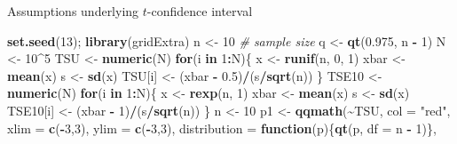 \documentclass[
  ignorenonframetext,
]{beamer}
\newenvironment{Shaded}{\begin{snugshade}}{\end{snugshade}}
\newcommand{\AttributeTok}[1]{\textcolor[rgb]{0.13,0.29,0.53}{#1}}
\newcommand{\CommentTok}[1]{\textcolor[rgb]{0.56,0.35,0.01}{\textit{#1}}}
\newcommand{\ControlFlowTok}[1]{\textcolor[rgb]{0.13,0.29,0.53}{\textbf{#1}}}
\newcommand{\DecValTok}[1]{\textcolor[rgb]{0.00,0.00,0.81}{#1}}
\newcommand{\FloatTok}[1]{\textcolor[rgb]{0.00,0.00,0.81}{#1}}
\newcommand{\FunctionTok}[1]{\textcolor[rgb]{0.13,0.29,0.53}{\textbf{#1}}}
\newcommand{\NormalTok}[1]{#1}
\newcommand{\OtherTok}[1]{\textcolor[rgb]{0.56,0.35,0.01}{#1}}
\newcommand{\SpecialCharTok}[1]{\textcolor[rgb]{0.81,0.36,0.00}{\textbf{#1}}}
\newcommand{\StringTok}[1]{\textcolor[rgb]{0.31,0.60,0.02}{#1}}
\begin{document}
\begin{frame}[fragile]{Assumptions underlying \(t\)-confidence interval}
\label{assumptions-underlying-t-confidence-interval-5}
\tiny

\begin{Shaded}
\begin{Highlighting}[]
\FunctionTok{set.seed}\NormalTok{(}\DecValTok{13}\NormalTok{); }\FunctionTok{library}\NormalTok{(gridExtra)}
\NormalTok{n }\OtherTok{\textless{}{-}} \DecValTok{10}           \CommentTok{\# sample size}
\NormalTok{q }\OtherTok{\textless{}{-}} \FunctionTok{qt}\NormalTok{(}\FloatTok{0.975}\NormalTok{, n }\SpecialCharTok{{-}} \DecValTok{1}\NormalTok{)}
\NormalTok{N }\OtherTok{\textless{}{-}} \DecValTok{10}\SpecialCharTok{\^{}}\DecValTok{5}
\NormalTok{TSU }\OtherTok{\textless{}{-}} \FunctionTok{numeric}\NormalTok{(N)}
\ControlFlowTok{for}\NormalTok{(i }\ControlFlowTok{in} \DecValTok{1}\SpecialCharTok{:}\NormalTok{N)\{}
\NormalTok{  x }\OtherTok{\textless{}{-}} \FunctionTok{runif}\NormalTok{(n, }\DecValTok{0}\NormalTok{, }\DecValTok{1}\NormalTok{)}
\NormalTok{  xbar }\OtherTok{\textless{}{-}} \FunctionTok{mean}\NormalTok{(x)}
\NormalTok{  s }\OtherTok{\textless{}{-}} \FunctionTok{sd}\NormalTok{(x)}
\NormalTok{  TSU[i] }\OtherTok{\textless{}{-}}\NormalTok{ (xbar }\SpecialCharTok{{-}} \FloatTok{0.5}\NormalTok{)}\SpecialCharTok{/}\NormalTok{(s}\SpecialCharTok{/}\FunctionTok{sqrt}\NormalTok{(n))}
\NormalTok{\}}
\NormalTok{TSE10 }\OtherTok{\textless{}{-}} \FunctionTok{numeric}\NormalTok{(N)}
\ControlFlowTok{for}\NormalTok{(i }\ControlFlowTok{in} \DecValTok{1}\SpecialCharTok{:}\NormalTok{N)\{}
\NormalTok{  x }\OtherTok{\textless{}{-}} \FunctionTok{rexp}\NormalTok{(n, }\DecValTok{1}\NormalTok{)}
\NormalTok{  xbar }\OtherTok{\textless{}{-}} \FunctionTok{mean}\NormalTok{(x)}
\NormalTok{  s }\OtherTok{\textless{}{-}} \FunctionTok{sd}\NormalTok{(x)}
\NormalTok{  TSE10[i] }\OtherTok{\textless{}{-}}\NormalTok{ (xbar }\SpecialCharTok{{-}} \DecValTok{1}\NormalTok{)}\SpecialCharTok{/}\NormalTok{(s}\SpecialCharTok{/}\FunctionTok{sqrt}\NormalTok{(n))}
\NormalTok{\}}
\NormalTok{n }\OtherTok{\textless{}{-}} \DecValTok{10}
\NormalTok{p1 }\OtherTok{\textless{}{-}} \FunctionTok{qqmath}\NormalTok{(}\SpecialCharTok{\textasciitilde{}}\NormalTok{TSU, }\AttributeTok{col =} \StringTok{"red"}\NormalTok{, }\AttributeTok{xlim =} \FunctionTok{c}\NormalTok{(}\SpecialCharTok{{-}}\DecValTok{3}\NormalTok{,}\DecValTok{3}\NormalTok{), }\AttributeTok{ylim =} \FunctionTok{c}\NormalTok{(}\SpecialCharTok{{-}}\DecValTok{3}\NormalTok{,}\DecValTok{3}\NormalTok{), }\AttributeTok{distribution =} \ControlFlowTok{function}\NormalTok{(p)\{}\FunctionTok{qt}\NormalTok{(p, }\AttributeTok{df =}\NormalTok{ n }\SpecialCharTok{{-}} \DecValTok{1}\NormalTok{)\}, }

\end{Highlighting}
\end{Shaded}
\end{frame}
\end{document}
